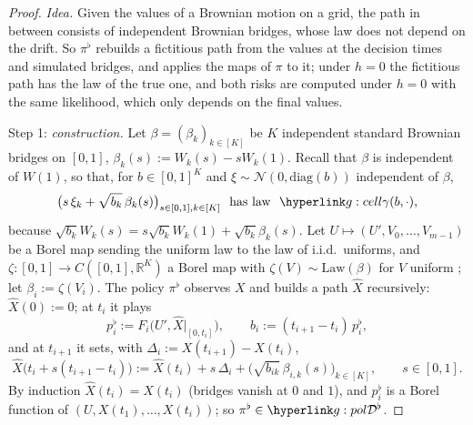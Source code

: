\documentclass[11pt]{article}
\newcommand{\R}{\mathbb{R}}
\newcommand{\1}{\mathbf{1}}
\begin{document}
\begin{proof}
\textit{Idea.} Given the values of a Brownian motion on a grid, the path in between consists of independent Brownian bridges, whose law does not depend on the drift.
So $\pi^\flat$ rebuilds a fictitious path from the values at the decision times and simulated bridges, and applies the maps of $\pi$ to it; under $h=0$ the fictitious
path has the law of the true one, and both risks are computed under $h=0$ with the same likelihood, which only depends on the final values.

Step 1: \emph{construction.} Let $\beta=(\beta_k)_{k\in[K]}$ be $K$ independent standard Brownian bridges on $[0,1]$, $\beta_k(s):=W_k(s)-sW_k(1)$. Recall that $\beta$ is
independent of $W(1)$, so that, for $b\in[0,1]^K$ and $\xi\sim\mathcal N(0,\mathrm{diag}(b))$ independent of $\beta$,
\begin{equation}\label{eq:g-bridge}
\big(s\,\xi_k+\sqrt{b_k}\,\beta_k(s)\big)_{s\in[0,1],k\in[K]}\ \text{ has law }\ \ggam(b,\cdot),
\end{equation}
because $\sqrt{b_k}W_k(s)=s\sqrt{b_k}W_k(1)+\sqrt{b_k}\beta_k(s)$. Let $U\mapsto(U',V_0,\dots,V_{m-1})$ be a Borel map sending the uniform law to the law of i.i.d.\ uniforms,
and $\zeta:[0,1]\to C([0,1],\R^K)$ a Borel map with $\zeta(V)\sim\mathrm{Law}(\beta)$ for $V$ uniform \citep[Lemma~3.22]{Kal02}; let $\beta_i:=\zeta(V_i)$. The policy
$\pi^\flat$ observes $X$ and builds a path $\hat X$ recursively: $\hat X(0):=0$; at $t_i$ it plays
\[
p^\flat_i:=F_i\big(U',\hat X|_{[0,t_i]}\big),\qquad b_i:=(t_{i+1}-t_i)\,p^\flat_i,
\]
and at $t_{i+1}$ it sets, with $\Delta_i:=X(t_{i+1})-X(t_i)$,
\[
\hat X\big(t_i+s(t_{i+1}-t_i)\big):=\hat X(t_i)+s\,\Delta_i+\big(\sqrt{b_{ik}}\,\beta_{i,k}(s)\big)_{k\in[K]},\qquad s\in[0,1].
\]
By induction $\hat X(t_i)=X(t_i)$ (bridges vanish at $0$ and $1$), and $p^\flat_i$ is a Borel function of $(U,X(t_1),\dots,X(t_i))$; so $\pi^\flat\in\gBc$.


\end{proof}
\end{document}
